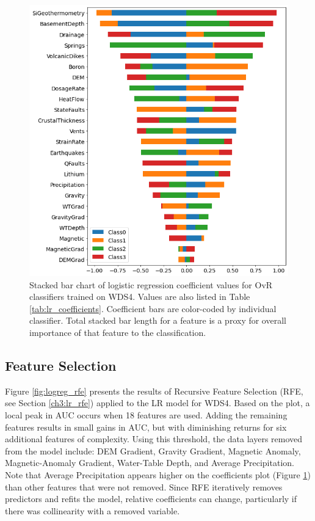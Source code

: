 \begin{figure}
\centering
\includegraphics[width=\textwidth]{templates/images/Figure-LR-coefficients.png}
\singlespacing
\caption[Logistic regression feature coefficients]{Stacked bar chart of logistic regression coefficient values for OvR classifiers trained on WDS4. Values are also listed in Table \ref{tab:lr_coefficients}. Coefficient bars are color-coded by individual classifier. Total stacked bar length for a feature is a proxy for overall importance of that feature to the classification.}
\label{fig:logreg_coefs}
\end{figure}

\subsection{Feature Selection} \label{ch5:lr_feature_selection}

Figure \ref{fig:logreg_rfe} presents the results of Recursive Feature Selection (RFE, see Section \ref{ch3:lr_rfe}) applied to the LR model for WDS4. Based on the plot, a local peak in AUC occurs when 18 features are used. Adding the remaining features results in small gains in AUC, but with diminishing returns for six additional features of complexity. Using this threshold, the data layers removed from the model include: DEM Gradient, Gravity Gradient, Magnetic Anomaly, Magnetic-Anomaly Gradient, Water-Table Depth, and Average Precipitation. Note that Average Precipitation appears higher on the coefficients plot (Figure \ref{fig:logreg_coefs}) than other features that were not removed. Since RFE iteratively removes predictors and refits the model, relative coefficients can change, particularly if there was collinearity with a removed variable.

